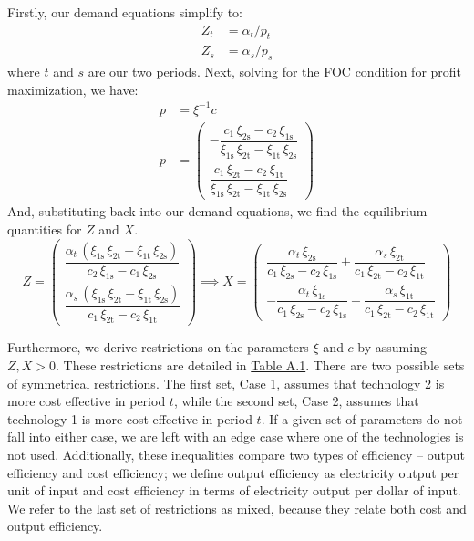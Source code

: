 \documentclass[11pt,a4paper]{extarticle}
\begin{document}
Firstly, our demand equations simplify to:
\begin{align}
Z_t &= \alpha_t / p_t \\
Z_s &= \alpha_s / p_s
\end{align}
where $t$ and $s$ are our two periods. Next, solving for the FOC condition for profit maximization, we have:
\begin{align*}
p &=  \xi^{-1} c \\
p &= \begin{pmatrix}
-\dfrac{c_{1}\,\xi _{\mathrm{2s}}-c_{2}\,\xi _{\mathrm{1s}}}{\xi _{\mathrm{1s}}\,\xi _{\mathrm{2t}}-\xi _{\mathrm{1t}}\,\xi _{\mathrm{2s}}}  \\[2ex]
\dfrac{c_{1}\,\xi _{\mathrm{2t}}-c_{2}\,\xi _{\mathrm{1t}}}{\xi _{\mathrm{1s}}\,\xi _{\mathrm{2t}}-\xi _{\mathrm{1t}}\,\xi _{\mathrm{2s}}} 
\end{pmatrix} 
\end{align*}
And, substituting back into our demand equations, we find the equilibrium quantities for $Z$ and $X$. 
$$
Z = \begin{pmatrix}
\dfrac{\alpha _{t}\,\left(\xi _{\mathrm{1s}}\,\xi _{\mathrm{2t}}-\xi _{\mathrm{1t}}\,\xi _{\mathrm{2s}}\right)}{c_{2}\,\xi _{\mathrm{1s}} - c_{1}\,\xi _{\mathrm{2s}}} \\[2ex]
\dfrac{\alpha _{s}\,\left(\xi _{\mathrm{1s}}\,\xi _{\mathrm{2t}}-\xi _{\mathrm{1t}}\,\xi _{\mathrm{2s}}\right)}{c_{1}\,\xi _{\mathrm{2t}}-c_{2}\,\xi _{\mathrm{1t}}} 
\end{pmatrix}
\implies 
X = \begin{pmatrix}
\dfrac{\alpha _{t}\,\xi _{\mathrm{2s}}}{c_{1}\,\xi _{\mathrm{2s}}-c_{2}\,\xi _{\mathrm{1s}}}+\dfrac{\alpha _{s}\,\xi _{\mathrm{2t}}}{c_{1}\,\xi _{\mathrm{2t}}-c_{2}\,\xi _{\mathrm{1t}}} \\[2ex] 
-\dfrac{\alpha _{t}\,\xi _{\mathrm{1s}}}{c_{1}\,\xi _{\mathrm{2s}}-c_{2}\,\xi _{\mathrm{1s}}}-\dfrac{\alpha _{s}\,\xi _{\mathrm{1t}}}{c_{1}\,\xi _{\mathrm{2t}}-c_{2}\,\xi _{\mathrm{1t}}}
\end{pmatrix}
$$

Furthermore, we derive restrictions on the parameters $\xi$ and $c$ by assuming $Z, X > 0$. These restrictions are detailed in \hyperref[tab:paramrest]{Table A.1}. There are two possible sets of symmetrical restrictions. The first set, Case 1, assumes that technology 2 is more cost effective in period $t$, while the second set, Case 2, assumes that technology 1 is more cost effective in period $t$. If a given set of parameters do not fall into either case, we are left with an edge case where one of the technologies is not used. Additionally, these inequalities compare two types of efficiency -- output efficiency and cost efficiency; we define output efficiency as electricity output per unit of input and cost efficiency in terms of electricity output per dollar of input. We refer to the last set of restrictions as mixed, because they relate both cost and output efficiency. 
\end{document}
